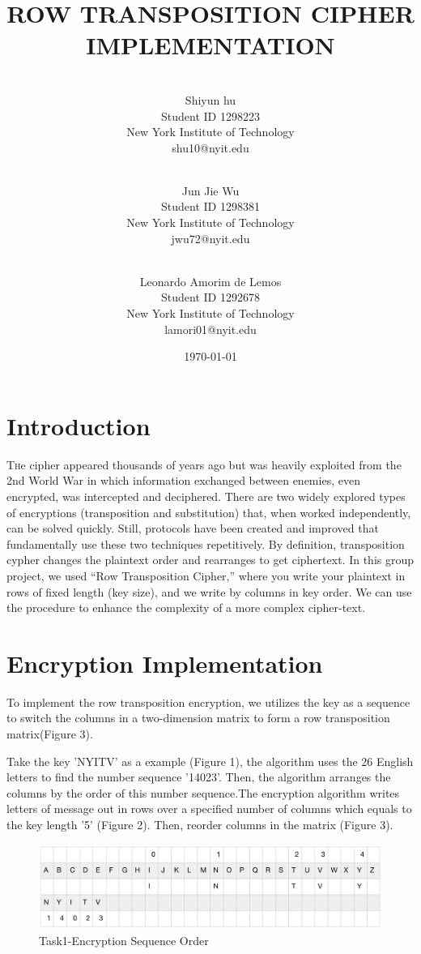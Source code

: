 \documentclass[twoside,twocolumn]{article}
\title{ROW TRANSPOSITION CIPHER IMPLEMENTATION} %
\author{ \\ \footnotesize Shiyun hu  \\ \footnotesize Student ID 1298223\\ \footnotesize New York Institute of Technology \\ \footnotesize shu10@nyit.edu \and \\\footnotesize Jun Jie Wu \\ \footnotesize Student ID 1298381 \\ \footnotesize New York Institute of Technology \\ \footnotesize jwu72@nyit.edu  \and \\ \footnotesize Leonardo Amorim de Lemos  \\ \footnotesize Student ID 1292678\\ \footnotesize New York Institute of Technology\\ \footnotesize lamori01@nyit.edu \\}
\date{\today} %
\begin{document}
\maketitle


\section{Introduction}

\lettrine[nindent=2em,lines=1] {T}he cipher appeared thousands of years ago but was heavily exploited from the 2nd World War in which information exchanged between enemies, even encrypted, was intercepted and deciphered. There are two widely explored types of encryptions (transposition and substitution) that, when worked independently, can be solved quickly. Still, protocols have been created and improved that fundamentally use these two techniques repetitively. By definition, transposition cypher changes the plaintext order and rearranges to get ciphertext. In this group project, we used “Row Transposition Cipher,” where you write your plaintext in rows of fixed length (key size), and we write by columns in key order. We can use the procedure to enhance the complexity of a more complex cipher-text.


\section{Encryption Implementation}
To implement the row transposition encryption, we utilizes the key as a sequence to switch the columns in a two-dimension matrix to form a row transposition matrix(Figure 3).

Take the key 'NYITV' as a example (Figure 1), the algorithm uses the 26 English letters to find the number sequence '14023'. Then, the algorithm arranges the columns by the order of this number sequence.The encryption algorithm writes letters of message out in rows over a specified number of columns which equals to the key length '5' (Figure 2). Then, reorder columns in the matrix (Figure 3). \\



\begin{figure}[!ht]
  \centering
  \includegraphics[scale=0.3]{./Graphs/Figure1.1.png}
  \caption{Task1-Encryption Sequence Order}
  \label{fig:testfig1}
\end{figure}
\end{document}
